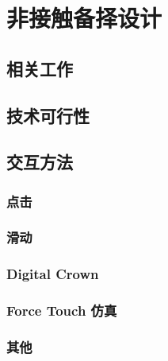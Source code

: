 \chapter{非接触备择设计}

\section{相关工作}

\section{技术可行性}

\section{交互方法}

\subsection{点击}

\subsection{滑动}

\subsection{Digital Crown}

\subsection{Force Touch 仿真}

\subsection{其他}
